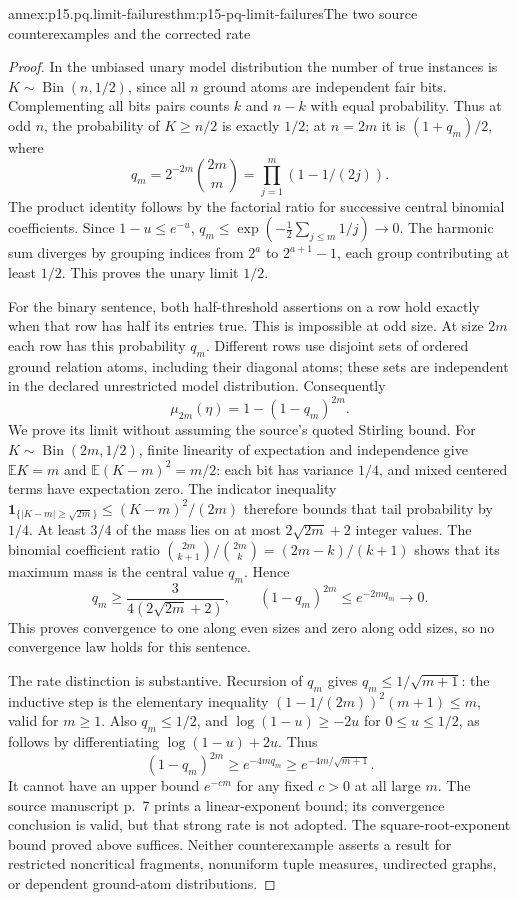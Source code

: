 \begin{annexitem}{annex:p15.pq.limit-failures}{thm:p15-pq-limit-failures}{The two source counterexamples and the corrected rate}
\begin{proof}
In the unbiased unary model distribution the number of true instances
is \(K\sim\operatorname{Bin}(n,1/2)\), since all \(n\) ground atoms
are independent fair bits. Complementing all bits pairs counts \(k\)
and \(n-k\) with equal probability. Thus at odd \(n\), the probability
of \(K\ge n/2\) is exactly \(1/2\); at \(n=2m\) it is
\((1+q_m)/2\), where
\[
 q_m=2^{-2m}\binom{2m}{m}
     =\prod_{j=1}^m(1-1/(2j)).
\]
The product identity follows by the factorial ratio for successive
central binomial coefficients. Since \(1-u\le e^{-u}\),
\(q_m\le\exp(-\tfrac12\sum_{j\le m}1/j)\to0\).
The harmonic sum diverges by grouping indices from \(2^a\) to
\(2^{a+1}-1\), each group contributing at least \(1/2\).
This proves the unary limit \(1/2\).

For the binary sentence, both half-threshold assertions on a row hold
exactly when that row has half its entries true. This is impossible at
odd size. At size \(2m\) each row has this probability \(q_m\).
Different rows use disjoint sets of ordered ground relation atoms,
including their diagonal atoms; these sets are independent in the
declared unrestricted model distribution. Consequently
\[
       \mu_{2m}(\eta)=1-(1-q_m)^{2m}.
\]
We prove its limit without assuming the source's quoted Stirling bound.
For \(K\sim\operatorname{Bin}(2m,1/2)\), finite linearity of expectation
and independence give \(\mathbb E K=m\) and
\(\mathbb E(K-m)^2=m/2\): each bit has variance \(1/4\), and
mixed centered terms have expectation zero.
The indicator inequality
\(\mathbf1_{\{|K-m|\ge\sqrt{2m}\}}\le(K-m)^2/(2m)\)
therefore bounds that tail probability by \(1/4\).
At least \(3/4\) of the mass lies on at most
\(2\sqrt{2m}+2\) integer values. The binomial coefficient ratio
\(\binom{2m}{k+1}/\binom{2m}{k}=(2m-k)/(k+1)\)
shows that its maximum mass is the central value \(q_m\).
Hence
\[
 q_m\ge\frac{3}{4(2\sqrt{2m}+2)},\qquad
 (1-q_m)^{2m}\le e^{-2m q_m}\longrightarrow0.
\]
This proves convergence to one along even sizes and zero along odd
sizes, so no convergence law holds for this sentence.

The rate distinction is substantive. Recursion of \(q_m\) gives
\(q_m\le1/\sqrt{m+1}\): the inductive step is the elementary inequality
\((1-1/(2m))^2(m+1)\le m\), valid for \(m\ge1\).
Also \(q_m\le1/2\), and
\(\log(1-u)\ge-2u\) for \(0\le u\le1/2\), as follows by
differentiating \(\log(1-u)+2u\).
Thus
\[
 (1-q_m)^{2m}\ge e^{-4m q_m}
                    \ge e^{-4m/\sqrt{m+1}}.
\]
It cannot have an upper bound \(e^{-cm}\) for any fixed \(c>0\)
at all large \(m\). The source manuscript p.~7 prints a
linear-exponent bound; its convergence conclusion is valid, but that
strong rate is not adopted. The square-root-exponent bound proved
above suffices. Neither counterexample asserts a result for restricted
noncritical fragments, nonuniform tuple measures, undirected graphs,
or dependent ground-atom distributions.
\end{proof}
\end{annexitem}

